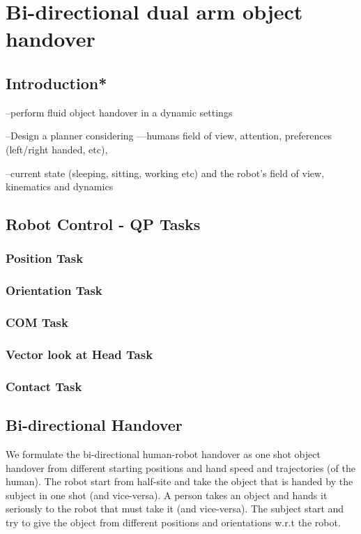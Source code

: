 \chapter{Bi-directional dual arm object handover\newline}

\newpage
\section{Introduction*}
--perform fluid object handover in a dynamic settings

--Design a planner considering —humans field of view, attention, preferences (left/right handed, etc),

--current state (sleeping, sitting, working etc) and the robot’s field of view, kinematics and dynamics


\newpage
\section{Robot Control - QP Tasks}\label{qpTasks}

\subsection{Position Task}\label{positionTask}

\subsection{Orientation Task}\label{orientationTask}

\subsection{COM Task}\label{comTask}

\subsection{Vector look at Head Task}\label{HeadTask}

\subsection{Contact Task}\label{contact}



\newpage
\section{Bi-directional Handover}
We formulate the bi-directional human-robot handover as one shot object handover from different starting positions and hand speed and trajectories (of the human). The robot start from half-site and take the object that is handed by the subject in one shot (and vice-versa). A person takes an object and hands it seriously to the robot that must take it (and vice-versa). The subject start and try to give the object from different positions and orientations w.r.t the robot.

